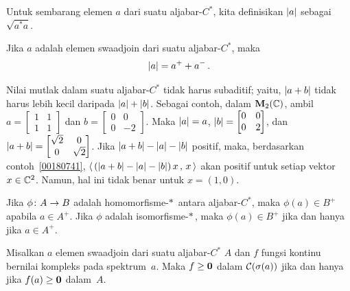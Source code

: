 \begin{defn} Untuk sembarang elemen $a$ dari suatu aljabar-$C^*$, kita definisikan
$\lvert a\rvert$ sebagai $\sqrt{a^*a}$.
\end{defn}

\begin{prop} Jika $a$ adalah elemen swaadjoin dari suatu aljabar-$C^*$, maka
  \[ \lvert a\rvert = a^+ + a^-\,. \]
\end{prop}

\begin{exam} Nilai mutlak dalam suatu aljabar-$C^*$ tidak harus
subaditif; yaitu, $\lvert a + b\rvert$ tidak harus lebih kecil daripada $\lvert a\rvert
+ \lvert b\rvert$. Sebagai contoh, dalam $\mathbf{M}_{2}({\mathbb{C}})$, ambil $a = \begin{bmatrix} 1 & 1 \\
1 & 1 \end{bmatrix}$ dan $b = \begin{bmatrix} 0 & 0 \\ 0 & -2
\end{bmatrix}$. Maka $\lvert a\rvert = a$, $\lvert b\rvert = \begin{bmatrix} 0 &
0 \\ 0 & 2 \end{bmatrix}$, dan $\lvert a + b\rvert = \begin{bmatrix} \sqrt{2} & 0 \\ 0 &
\sqrt{2}
\end{bmatrix}$. Jika $\lvert a + b\rvert - \lvert a\rvert - \lvert b\rvert$ positif, maka, berdasarkan
contoh~\ref{00180741}, $\langle\,(\lvert a + b\rvert - \lvert a\rvert - \lvert b\rvert)\,x\,,\,x\,\rangle$
akan positif untuk setiap vektor $x \in \mathbb{C}^2$. Namun, hal ini tidak benar untuk $x = (1,0)$.
\end{exam}

\begin{prop}\label{0018201} Jika $\phi\colon A \rightarrow B$ adalah homomorfisme-$*\,$ antara
aljabar-$C^*$, maka $\phi(a) \in B^+$ apabila $a \in A^+$. Jika $\phi$ adalah
isomorfisme-$*\,$, maka $\phi(a) \in B^+$ jika dan hanya jika $a \in A^+$.
\end{prop}

\begin{prop} Misalkan $a$ elemen swaadjoin dari suatu aljabar-$C^*$ $A$ dan $f$ fungsi kontinu
bernilai kompleks pada spektrum~$a$. Maka $f \ge \mathbf{0}$ dalam $\mathcal{C}(\sigma(a))$ jika dan hanya jika $f(a) \ge \mathbf{0}$ dalam~$A$.
\end{prop}

